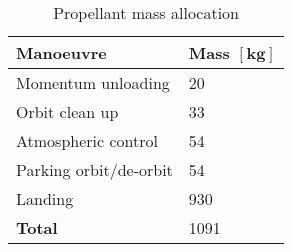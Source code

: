 \begin{table}[ht]
	\centering
	\caption{Propellant mass allocation}
	\label{tab:PropMassBudget}
	\begin{tabular}{|l|l|} \hline
		\textbf {Manoeuvre}             & \textbf{Mass $\mathbf{[kg]}$ } \\ \hline \hline
		Momentum unloading       &		 20       \\ \hline
		Orbit clean up &		  33      \\ \hline
		Atmospheric control           		   &  54      \\ \hline 
		Parking orbit/de-orbit            	   & 54    \\ \hline
		Landing            	   &  930     \\ \hline \hline
		\textbf {Total}                 &  1091      \\ \hline
	\end{tabular}
\end{table}
